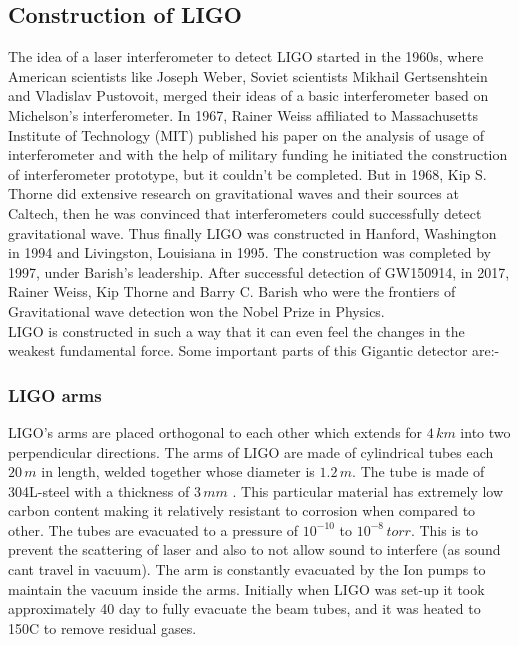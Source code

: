 \subsection{Construction of LIGO}

\hspace{1cm} The idea of a laser interferometer to detect LIGO started in the 1960s, where American scientists like Joseph Weber, Soviet scientists Mikhail Gertsenshtein and Vladislav Pustovoit, merged their ideas of a basic interferometer based on Michelson's interferometer. In 1967, Rainer Weiss affiliated to Massachusetts Institute of Technology (MIT) published his paper on the analysis of usage of interferometer and with the help of military funding he initiated the construction of interferometer prototype, but it couldn't be completed. But in 1968, Kip S. Thorne did extensive research on gravitational waves and their sources at Caltech, then he was convinced that interferometers could successfully detect gravitational wave. Thus finally LIGO was constructed in Hanford, Washington in 1994 and Livingston, Louisiana in 1995. The construction was completed by 1997, under Barish's leadership.  After successful detection of GW150914, in 2017, Rainer Weiss, Kip Thorne and Barry C. Barish who were the frontiers of Gravitational wave detection won the Nobel Prize in Physics. \\
LIGO is constructed in such a way that it can even feel the changes in the weakest fundamental force. Some important parts of this Gigantic detector are:- 

\subsubsection{LIGO arms}

LIGO's arms are placed orthogonal to each other which extends for $4\,km$ into two perpendicular directions. The arms of LIGO are made of cylindrical tubes each $20\,m$ in length, welded together whose diameter is $1.2\,m$. The tube is made of 304L-steel with a thickness of $3\,mm$ \cite{carpenter2000laser}. This particular material has extremely low carbon content making it relatively resistant to corrosion when compared to other. The tubes are evacuated to a pressure of $10^{-10}$ to $10^{-8}\, torr.$ This is to prevent the scattering of laser and also to not allow sound to interfere (as sound cant travel in vacuum). The arm is constantly evacuated by the Ion pumps to maintain the vacuum inside the arms. Initially when LIGO was set-up it took approximately 40 day to fully evacuate the beam tubes, and it was heated to 150\degree C to remove residual gases. \cite{vacuum} 

